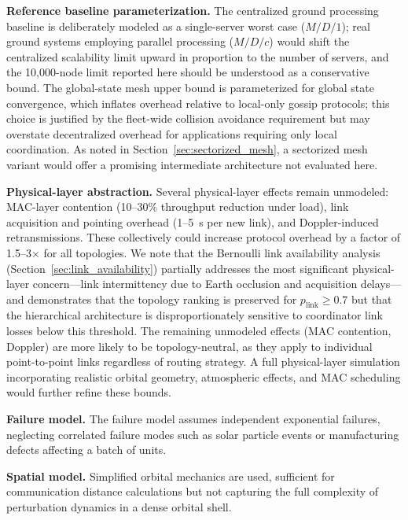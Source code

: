 \documentclass[journal]{IEEEtran}
\begin{document}
\textbf{Reference baseline parameterization.} The centralized ground processing baseline is deliberately modeled as a single-server worst case ($M/D/1$); real ground systems employing parallel processing ($M/D/c$) would shift the centralized scalability limit upward in proportion to the number of servers, and the 10{,}000-node limit reported here should be understood as a conservative bound. The global-state mesh upper bound is parameterized for global state convergence, which inflates overhead relative to local-only gossip protocols; this choice is justified by the fleet-wide collision avoidance requirement but may overstate decentralized overhead for applications requiring only local coordination. As noted in Section~\ref{sec:sectorized_mesh}, a sectorized mesh variant would offer a promising intermediate architecture not evaluated here.

\textbf{Physical-layer abstraction.} Several physical-layer effects remain unmodeled: MAC-layer contention (10--30\% throughput reduction under load), link acquisition and pointing overhead (1--5~s per new link), and Doppler-induced retransmissions. These collectively could increase protocol overhead by a factor of 1.5--3$\times$ for all topologies. We note that the Bernoulli link availability analysis (Section~\ref{sec:link_availability}) partially addresses the most significant physical-layer concern---link intermittency due to Earth occlusion and acquisition delays---and demonstrates that the topology ranking is preserved for $p_{\text{link}} \geq 0.7$ but that the hierarchical architecture is disproportionately sensitive to coordinator link losses below this threshold. The remaining unmodeled effects (MAC contention, Doppler) are more likely to be topology-neutral, as they apply to individual point-to-point links regardless of routing strategy. A full physical-layer simulation incorporating realistic orbital geometry, atmospheric effects, and MAC scheduling would further refine these bounds.

\textbf{Failure model.} The failure model assumes independent exponential failures, neglecting correlated failure modes such as solar particle events or manufacturing defects affecting a batch of units.

\textbf{Spatial model.} Simplified orbital mechanics are used, sufficient for communication distance calculations but not capturing the full complexity of perturbation dynamics in a dense orbital shell.


\end{document}
